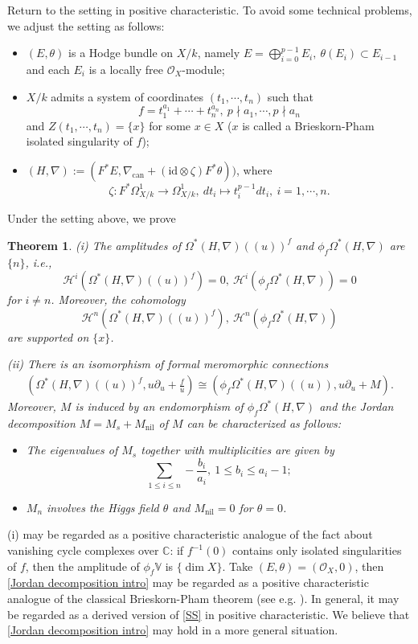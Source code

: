 \documentclass[12pt, a4paper]{article}
\newtheorem{theorem}{Theorem}[section]
\begin{document}
Return to the setting in positive characteristic. To avoid some technical problems, we adjust the setting as follows:
\begin{itemize}
\item $(E,\theta)$ is a Hodge bundle on $X/k$, namely 
$E=\bigoplus_{i=0}^{p-1}E_i,~\theta(E_i)\subset E_{i-1}$
and each $E_i$ is a locally free $\mathcal O_X$-module;
\item $X/k$ admits a system of coordinates $(t_1,\cdots,t_n)$ such that
$$
f=t_1^{a_1}+\cdots+t_n^{a_n},~p\nmid a_1,\cdots,p\nmid a_n
$$
and $Z(t_1,\cdots,t_n)=\{x\}$ for some $x\in X$ ($x$ is called a Brieskorn-Pham isolated singularity of $f$);
\item $(H,\nabla):=(F^*E,\nabla_\mathrm{can}+(\mathrm{id}\otimes\zeta)F^*\theta))$, where
$$
\zeta:F^*\Omega^1_{X/k}\to\Omega^1_{X/k},~dt_i\mapsto t_i^{p-1}dt_i,~i=1,\cdots,n.
$$
\end{itemize}
Under the setting above, we prove
\begin{theorem}
(i)  The amplitudes of $\Omega^*(H,\nabla)((u))^f$ and $\phi_f\Omega^*(H,\nabla)$ are $\{n\}$, i.e.,
$$
\mathcal H^i(\Omega^*(H,\nabla)((u))^f)=0,~\mathcal H^i(\phi_f\Omega^*(H,\nabla))=0
$$
for $i\neq n$. Moreover, the cohomology
$$
\mathcal H^n(\Omega^*(H,\nabla)((u))^f),~\mathcal H^n(\phi_f\Omega^*(H,\nabla))
$$
are supported on $\{x\}$.

(ii) There is an isomorphism of formal meromorphic connections
\begin{eqnarray}\label{Jordan decomposition intro}
(\Omega^*(H,\nabla)((u))^f,u\partial_u+\frac{f}{u})\cong(\phi_f\Omega^*(H,\nabla)((u)),u\partial_u+M).
\end{eqnarray}
Moreover, $M$ is induced by an endomorphism of $\phi_f\Omega^*(H,\nabla)$ and the Jordan decomposition $M=M_s+M_\mathrm{nil}$ of $M$ can be characterized as follows:
\begin{itemize}
\item The  eigenvalues of  $M_s$  together with multiplicities are given by
$$
\sum_{1\leq i\leq n}-\frac{b_i}{a_i},~1\leq b_i\leq a_i-1;
$$
\item $M_n$ involves the Higgs field $\theta$ and $M_\mathrm{nil}=0$ for $\theta=0$.
\end{itemize}
\end{theorem}
(i) may be regarded as a positive characteristic analogue of the fact about vanishing cycle complexes over $\mathbb C$: if $f^{-1}(0)$ contains only isolated singularities of $f$, then the amplitude of $\phi_f\mathbb V$ is $\{\dim X\}$. Take $(E,\theta)=(\mathcal O_X,0)$, then \eqref{Jordan decomposition intro} may be regarded as a positive characteristic analogue of the classical Brieskorn-Pham theorem (see e.g. \cite[Theorem 2.19]{Max}). In general, it may be regarded as a derived version of \eqref{SS} in positive characteristic. We believe that \eqref{Jordan decomposition intro} may hold in a more general situation.
\end{document}

